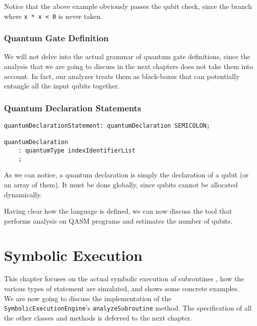 \documentclass[12pt,a4paper]{report}
\theoremstyle{definition}
\theoremstyle{definition}
\theoremstyle{definition}
\begin{document}
Notice that the above example obviously passes the qubit check, since the branch where \texttt{x * x < 0} is never taken.

\subsection{Quantum Gate Definition}
We will not delve into the actual grammar of quantum gate definitions, since the analysis that we are going to discuss in the next chapters does not take them into account. In fact, our analyzer treats them as black-boxes that can potentially entangle all the input qubits together.


\subsection{Quantum Declaration Statements}
\begin{lstlisting}
quantumDeclarationStatement: quantumDeclaration SEMICOLON;

quantumDeclaration
    : quantumType indexIdentifierList
    ;
\end{lstlisting}
As we can notice, a quantum declaration is simply the declaration of a qubit (or an array of them). It must be done globally, since qubits cannot be allocated dynamically.

Having clear how the language is defined, we can now discuss the tool that performs analysis on QASM programs and estimates the number of qubits.





\chapter{Symbolic Execution}
This chapter focuses on the actual symbolic execution of subroutines \cite{SurveySymExec-CSUR18}, how the various types of statement are simulated, and shows some concrete examples.\\
We are now going to discuss the implementation of the \texttt{SymbolicExecutionEngine}'s \texttt{analyzeSubroutine} method. The specification of all the other classes and methods is deferred to the next chapter.\\
\end{document}
